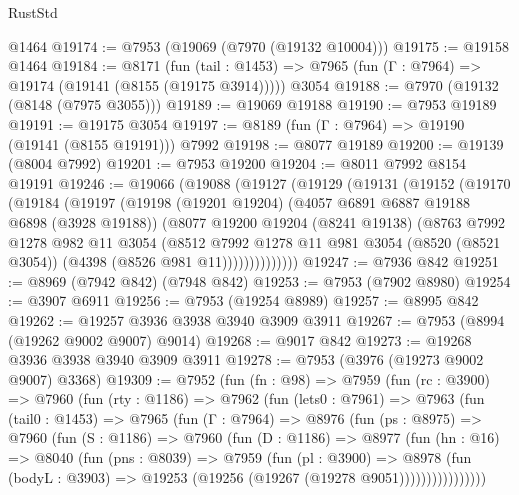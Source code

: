 \begin{lexlean}{RustStd}
\begin{coremodule}
    @1464
@19174 := @7953 (@19069 (@7970 (@19132 @10004)))
@19175 := @19158 @1464
@19184 := @8171
    (fun (tail : @1453) => @7965 (fun (Γ : @7964) => @19174 (@19141 (@8155 (@19175 @3914)))))
    @3054
@19188 := @7970 (@19132 (@8148 (@7975 @3055)))
@19189 := @19069 @19188
@19190 := @7953 @19189
@19191 := @19175 @3054
@19197 := @8189 (fun (Γ : @7964) => @19190 (@19141 (@8155 @19191))) @7992
@19198 := @8077 @19189
@19200 := @19139 (@8004 @7992)
@19201 := @7953 @19200
@19204 := @8011 @7992 @8154 @19191
@19246 := @19066
    (@19088
      (@19127
        (@19129
          (@19131
            (@19152
              (@19170
                (@19184
                  (@19197
                    (@19198
                      (@19201 @19204)
                      (@4057 @6891 @6887 @19188 @6898 (@3928 @19188))
                      (@8077
                        @19200
                        @19204
                        (@8241 @19138)
                        (@8763
                          @7992
                          @1278
                          @982
                          @11
                          @3054
                          (@8512
                            @7992
                            @1278
                            @11
                            @981
                            @3054
                            (@8520 (@8521 @3054))
                            (@4398 (@8526 @981 @11))))))))))))))
@19247 := @7936 @842
@19251 := @8969 (@7942 @842) (@7948 @842)
@19253 := @7953 (@7902 @8980)
@19254 := @3907 @6911
@19256 := @7953 (@19254 @8989)
@19257 := @8995 @842
@19262 := @19257 @3936 @3938 @3940 @3909 @3911
@19267 := @7953 (@8994 (@19262 @9002 @9007) @9014)
@19268 := @9017 @842
@19273 := @19268 @3936 @3938 @3940 @3909 @3911
@19278 := @7953 (@3976 (@19273 @9002 @9007) @3368)
@19309 := @7952
    (fun (fn : @98) =>
    @7959
      (fun (rc : @3900) =>
      @7960
        (fun (rty : @1186) =>
        @7962
          (fun (lets0 : @7961) =>
          @7963
            (fun (tail0 : @1453) =>
            @7965
              (fun (Γ : @7964) =>
              @8976
                (fun (ps : @8975) =>
                @7960
                  (fun (S : @1186) =>
                  @7960
                    (fun (D : @1186) =>
                    @8977
                      (fun (hn : @16) =>
                      @8040
                        (fun (pns : @8039) =>
                        @7959
                          (fun (pl : @3900) =>
                          @8978
                            (fun (bodyL : @3903) =>
                            @19253 (@19256 (@19267 (@19278 @9051))))))))))))))))

\end{coremodule}
\end{lexlean}
